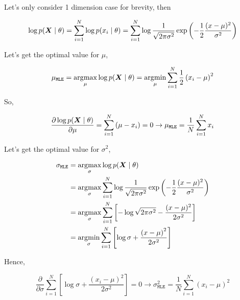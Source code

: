 Let's only consider 1 dimension case for brevity, then

\begin{equation}
	\log p\giventhat{\vX}{\theta}  = \sum_{i=1}^{N} \log p\giventhat{x_i}{\theta} = \sum_{i=1}^{N} \log \frac{1}{\sqrt{2\pi \sigma^2}} \exp\left(-\frac{1}{2} \frac{(x - \mu)^2}{\sigma^2}\right)
\end{equation}

Let's get the optimal value for \(\mu\),

\begin{equation}
	\mu_{\mathtt{MLE}} = \argmax_{\mu} \log p\giventhat{\vX}{\theta} = \argmin_{\mu} \sum_{i=1}^{N} \frac{1}{2} \left(x_i - \mu\right)^2
\end{equation}

So,

\begin{equation}
	\frac{\partial \log p\giventhat{\vX}{\theta}}{\partial \mu} = \sum_{i=1}^{N} \left(\mu - x_i\right) = 0 \rightarrow \mu_{\mathtt{MLE}} = \frac{1}{N} \sum_{i=1}^{N} x_i
\end{equation}


Let's get the optimal value for \(\sigma^2\),

\begin{align*}
	\sigma_{\mathtt{MLE}} & = \argmax_{\sigma} \log p\giventhat{\vX}{\theta}                                                                                \\
	                      & =\argmax_{\sigma} \sum_{i=1}^{N} \log \frac{1}{\sqrt{2\pi \sigma^2}} \exp\left(-\frac{1}{2} \frac{(x - \mu)^2}{\sigma^2}\right) \\
	                      & = \argmax_{\sigma} \sum_{i=1}^{N} \left[ - \log\sqrt{2\pi \sigma^2} - \frac{(x - \mu)^2}{2\sigma^2} \right]                     \\
	                      & = \argmin_{\sigma} \sum_{i=1}^N \left[ \log \sigma + \frac{\left(x - \mu\right)^2}{2\sigma^2}\right]                            \\
\end{align*}

Hence,

\begin{equation}
	\frac{\partial}{\partial \sigma} \sum_{i=1}^N \left[\log \sigma + \frac{\left(x_i - \mu\right)^2}{2\sigma^2}\right] = 0 \rightarrow \sigma_{\mathtt{MLE}}^2 = \frac{1}{N} \sum_{i=1}^{N} \left(x_i - \mu\right)^2
\end{equation}

